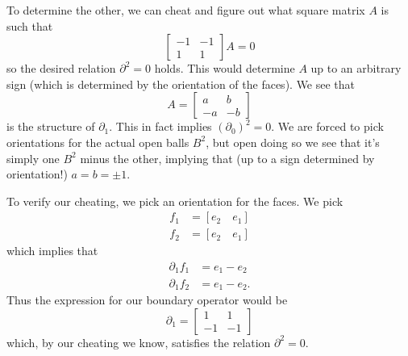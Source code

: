 To determine
the other, we can cheat and figure out what square matrix $A$ is such
that
\begin{equation}%
\begin{bmatrix} -1 & -1\\1 & 1\end{bmatrix}A = 0
\end{equation}
so the desired relation $\partial^{2}=0$ holds. This would
determine $A$ up to an arbitrary sign (which is determined by the
orientation of the faces). We see that
\begin{equation}%
A = \begin{bmatrix}a & b\\
-a & -b\end{bmatrix}
\end{equation}
is the structure of $\partial_{1}$. This in fact implies
$(\partial_{0})^{2}=0$. We are forced to pick orientations for
the actual open balls $B^{2}$, but open doing so we see that it's
simply one $B^{2}$ minus the other, implying that (up to a sign
determined by orientation!) $a=b=\pm1$.

To verify our cheating, we pick an orientation for the faces. We
pick
\begin{subequations}
\begin{align}
f_{1} &= [e_{2} \quad e_{1}]\\
f_{2} &= [e_{2} \quad e_{1}]
\end{align}
\end{subequations}
which implies that
\begin{subequations}
\begin{align}
\partial_{1}f_{1} &= e_{1} - e_{2}\\
\partial_{1}f_{2} &= e_{1} - e_{2}.
\end{align}
\end{subequations}
Thus the expression for our boundary operator would be
\begin{equation}%
\partial_{1} = \begin{bmatrix}1 & 1\\
-1 & -1\end{bmatrix}
\end{equation}
which, by our cheating we know, satisfies the relation
$\partial^{2}=0$.

